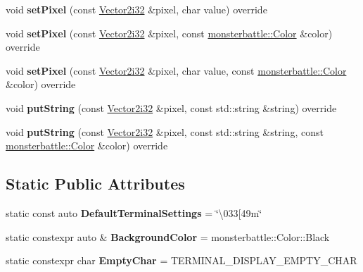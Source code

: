 \begin{DoxyCompactItemize}
void {\bfseries set\+Pixel} (const \hyperlink{structmonsterbattle_1_1Vector}{Vector2i32} \&pixel, char value) override
\item 
\mbox{\label{classmonsterbattle_1_1TerminalDisplay_ab69dc42c1c4f5c7dc377880686c9762a}} 
void {\bfseries set\+Pixel} (const \hyperlink{structmonsterbattle_1_1Vector}{Vector2i32} \&pixel, const \hyperlink{structmonsterbattle_1_1Color}{monsterbattle\+::\+Color} \&color) override
\item 
\mbox{\label{classmonsterbattle_1_1TerminalDisplay_ab4059bd42ac0e69db2d088b3b56fadc2}} 
void {\bfseries set\+Pixel} (const \hyperlink{structmonsterbattle_1_1Vector}{Vector2i32} \&pixel, char value, const \hyperlink{structmonsterbattle_1_1Color}{monsterbattle\+::\+Color} \&color) override
\item 
\mbox{\label{classmonsterbattle_1_1TerminalDisplay_a79eb42f7a3df1734f84e0c8e2c5abd8e}} 
void {\bfseries put\+String} (const \hyperlink{structmonsterbattle_1_1Vector}{Vector2i32} \&pixel, const std\+::string \&string) override
\item 
\mbox{\label{classmonsterbattle_1_1TerminalDisplay_a22ee37c05eb0d90d18ae9721931abb39}} 
void {\bfseries put\+String} (const \hyperlink{structmonsterbattle_1_1Vector}{Vector2i32} \&pixel, const std\+::string \&string, const \hyperlink{structmonsterbattle_1_1Color}{monsterbattle\+::\+Color} \&color) override
\end{DoxyCompactItemize}
\subsection*{Static Public Attributes}
\begin{DoxyCompactItemize}
\item 
\mbox{\label{classmonsterbattle_1_1TerminalDisplay_a8c1cb84db91813c82d3d50f9acf967c8}} 
static const auto {\bfseries Default\+Terminal\+Settings} = \char`\"{}\textbackslash{}033\mbox{[}49m\char`\"{}
\item 
\mbox{\label{classmonsterbattle_1_1TerminalDisplay_a88971b0c2d95ac5d48df00bab48cae16}} 
static constexpr auto \& {\bfseries Background\+Color} = monsterbattle\+::\+Color\+::\+Black
\item 
\mbox{\label{classmonsterbattle_1_1TerminalDisplay_ae21803e29b28f28ed4f3a842d5e5747c}} 
static constexpr char {\bfseries Empty\+Char} = T\+E\+R\+M\+I\+N\+A\+L\+\_\+\+D\+I\+S\+P\+L\+A\+Y\+\_\+\+E\+M\+P\+T\+Y\+\_\+\+C\+H\+AR
\end{DoxyCompactItemize}


